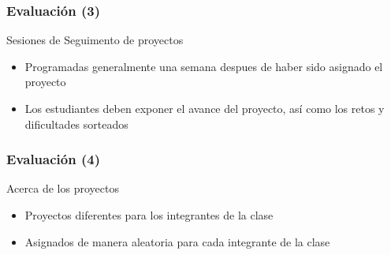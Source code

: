 \begin{frame}
\frametitle{Evaluación (3)}
Sesiones de Seguimento de proyectos
\begin{itemize}
\item Programadas generalmente una semana despues de haber sido asignado el proyecto
\item Los estudiantes deben exponer el avance del proyecto, as\'i como los retos y dificultades sorteados
\end{itemize}
\end{frame}


\begin{frame}
\frametitle{Evaluación (4)}
Acerca de los proyectos
\begin{itemize}
\item Proyectos diferentes para los integrantes de la clase 
\item Asignados de manera aleatoria para cada integrante de la clase
\end{itemize}
\end{frame}


